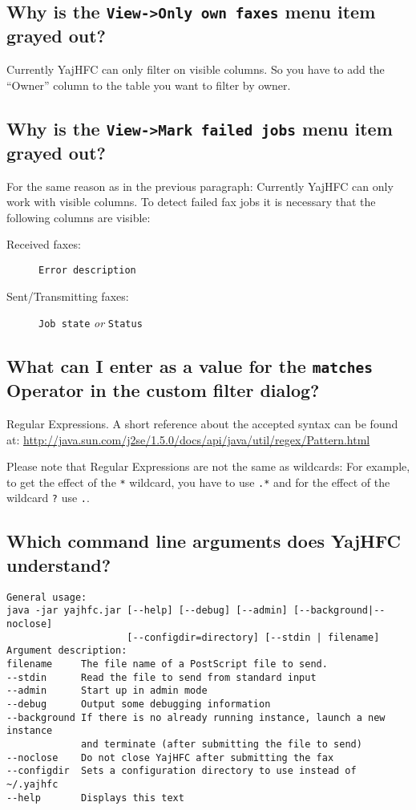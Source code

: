 \documentclass[a4paper,10pt]{scrartcl}
\begin{document}
\subsection{Why is the \texttt{View->Only own faxes} menu item grayed out?}

Currently YajHFC can only filter on visible columns. So you have to add the 
``Owner'' column to the table you want to filter by owner.

\subsection{Why is the \texttt{View->Mark failed jobs} menu item grayed out?}

For the same reason as in the previous paragraph: Currently YajHFC can only work with visible columns.
To detect failed fax jobs it is necessary that the following columns are visible:
\begin{description}
\item[Received faxes:] \texttt{Error description}
\item[Sent/Transmitting faxes:] \texttt{Job state} \emph{or} \texttt{Status}
\end{description}

\subsection{What can I enter as a value for the \texttt{matches} Operator in the custom filter dialog?}

Regular Expressions. A short reference about the accepted syntax can be found at:
\url{http://java.sun.com/j2se/1.5.0/docs/api/java/util/regex/Pattern.html}

Please note that Regular Expressions are not the same as wildcards: 
For example, to get the effect of the \verb.*. wildcard, you have to use \verb#.*# and 
for the effect of the wildcard \verb#?# use \verb#.#.

\subsection{Which command line arguments does YajHFC understand?}

\begin{verbatim}
General usage:
java -jar yajhfc.jar [--help] [--debug] [--admin] [--background|--noclose] 
                     [--configdir=directory] [--stdin | filename]
Argument description:
filename     The file name of a PostScript file to send.
--stdin      Read the file to send from standard input
--admin      Start up in admin mode
--debug      Output some debugging information
--background If there is no already running instance, launch a new instance
             and terminate (after submitting the file to send)
--noclose    Do not close YajHFC after submitting the fax
--configdir  Sets a configuration directory to use instead of ~/.yajhfc
--help       Displays this text
\end{verbatim}
\end{document}
